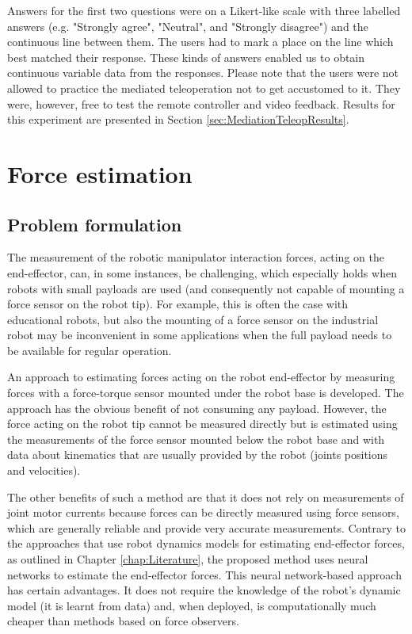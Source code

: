 Answers for the first two questions were on a Likert-like scale with three labelled answers (e.g. "Strongly agree", "Neutral", and "Strongly disagree") and the continuous line between them. The users had to mark a place on the line which best matched their response. These kinds of answers enabled us to obtain continuous variable data from the responses. Please note that the users were not allowed to practice the mediated teleoperation not to get accustomed to it. They were, however, free to test the remote controller and video feedback. Results for this experiment are presented in Section \ref{sec:MediationTeleopResults}.

\section{Force estimation}
\label{sec:MMForceEstimation}

\subsection{Problem formulation}

The measurement of the robotic manipulator interaction forces, acting on the end-effector, can, in some instances, be challenging, which especially holds when robots with small payloads are used (and consequently not capable of mounting a force sensor on the robot tip). For example, this is often the case with educational robots, but also the mounting of a force sensor on the industrial robot may be inconvenient in some applications when the full payload needs to be available for regular operation.

An approach to estimating forces acting on the robot end-effector by measuring forces with a force-torque sensor mounted under the robot base is developed. The approach has the obvious benefit of not consuming any payload. However, the force acting on the robot tip cannot be measured directly but is estimated using the measurements of the force sensor mounted below the robot base and with data about kinematics that are usually provided by the robot (joints positions and velocities).

The other benefits of such a method are that it does not rely on measurements of joint motor currents because forces can be directly measured using force sensors, which are generally reliable and provide very accurate measurements. Contrary to the approaches that use robot dynamics models for estimating end-effector forces, as outlined in Chapter \ref{chap:Literature}, the proposed method uses neural networks to estimate the end-effector forces. This neural network-based approach has certain advantages. It does not require the knowledge of the robot's dynamic model (it is learnt from data) and, when deployed, is computationally much cheaper than methods based on force observers.

